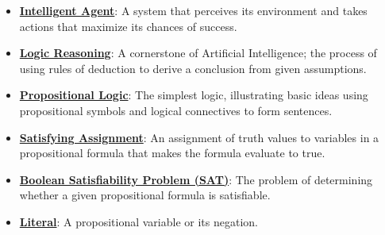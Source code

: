 \documentclass{article}%
\begin{document}
\begin{itemize}[leftmargin=*]%
\item \href{https://purdue.brightspace.com/d2l/common/assets/pdfjs-d2l-dist/1.0.14-legacy/web/viewer.html?file=%2Fcontent%2Fenforced%2F1095467-wl.202510.CS.24300.001%2F13L1-Logic.pdf%3Fou%3D1095467&lang=en-us&container=d2l-fileviewer-rendered-pdf&fullscreen=d2l-fileviewer-rendered-pdf-dialog&height=667#page=3}{\textbf{Intelligent Agent}}: A system that perceives its environment and takes actions that maximize its chances of success.%
\item \href{https://purdue.brightspace.com/d2l/common/assets/pdfjs-d2l-dist/1.0.14-legacy/web/viewer.html?file=%2Fcontent%2Fenforced%2F1095467-wl.202510.CS.24300.001%2F13L1-Logic.pdf%3Fou%3D1095467&lang=en-us&container=d2l-fileviewer-rendered-pdf&fullscreen=d2l-fileviewer-rendered-pdf-dialog&height=667#page=4}{\textbf{Logic Reasoning}}: A cornerstone of Artificial Intelligence; the process of using rules of deduction to derive a conclusion from given assumptions.%
\item \href{https://purdue.brightspace.com/d2l/common/assets/pdfjs-d2l-dist/1.0.14-legacy/web/viewer.html?file=%2Fcontent%2Fenforced%2F1095467-wl.202510.CS.24300.001%2F13L1-Logic.pdf%3Fou%3D1095467&lang=en-us&container=d2l-fileviewer-rendered-pdf&fullscreen=d2l-fileviewer-rendered-pdf-dialog&height=667#page=8}{\textbf{Propositional Logic}}: The simplest logic, illustrating basic ideas using propositional symbols and logical connectives to form sentences.%
\item \href{https://purdue.brightspace.com/d2l/common/assets/pdfjs-d2l-dist/1.0.14-legacy/web/viewer.html?file=%2Fcontent%2Fenforced%2F1095467-wl.202510.CS.24300.001%2F13L1-Logic.pdf%3Fou%3D1095467&lang=en-us&container=d2l-fileviewer-rendered-pdf&fullscreen=d2l-fileviewer-rendered-pdf-dialog&height=667#page=15}{\textbf{Satisfying Assignment}}: An assignment of truth values to variables in a propositional formula that makes the formula evaluate to true.%
\item \href{https://purdue.brightspace.com/d2l/common/assets/pdfjs-d2l-dist/1.0.14-legacy/web/viewer.html?file=%2Fcontent%2Fenforced%2F1095467-wl.202510.CS.24300.001%2F13L1-Logic.pdf%3Fou%3D1095467&lang=en-us&container=d2l-fileviewer-rendered-pdf&fullscreen=d2l-fileviewer-rendered-pdf-dialog&height=667#page=15}{\textbf{Boolean Satisfiability Problem (SAT)}}: The problem of determining whether a given propositional formula is satisfiable.%
\item \href{https://purdue.brightspace.com/d2l/common/assets/pdfjs-d2l-dist/1.0.14-legacy/web/viewer.html?file=%2Fcontent%2Fenforced%2F1095467-wl.202510.CS.24300.001%2F13L1-Logic.pdf%3Fou%3D1095467&lang=en-us&container=d2l-fileviewer-rendered-pdf&fullscreen=d2l-fileviewer-rendered-pdf-dialog&height=667#page=16}{\textbf{Literal}}: A propositional variable or its negation.%

\end{itemize}
\end{document}
